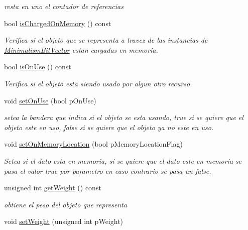 \begin{DoxyCompactItemize}
\begin{DoxyCompactList}\small\item\em resta en uno el contador de referencias \end{DoxyCompactList}\item 
bool \hyperlink{class_minimalism_bit_vector_aa8bba4e5bcfae52caf3c99beb7aae0cf}{is\-Charged\-On\-Memory} () const 
\begin{DoxyCompactList}\small\item\em Verifica si el objeto que se representa a travez de las instancias de \hyperlink{class_minimalism_bit_vector}{Minimalism\-Bit\-Vector} estan cargadas en memoria. \end{DoxyCompactList}\item 
bool \hyperlink{class_minimalism_bit_vector_a7ebf4e232220001d18be6275d9868587}{is\-On\-Use} () const 
\begin{DoxyCompactList}\small\item\em Verifica si el objeto esta siendo usado por algun otro recurso. \end{DoxyCompactList}\item 
void \hyperlink{class_minimalism_bit_vector_a63b95b7f8446bfc105d42837be83b42b}{set\-On\-Use} (bool p\-On\-Use)
\begin{DoxyCompactList}\small\item\em setea la bandera que indica si el objeto se esta usando, true si se quiere que el objeto este en uso, false si se quiere que el objeto ya no este en uso. \end{DoxyCompactList}\item 
void \hyperlink{class_minimalism_bit_vector_a747ed61c44f091dd3326644216a923dd}{set\-On\-Memory\-Location} (bool p\-Memory\-Location\-Flag)
\begin{DoxyCompactList}\small\item\em Setea si el dato esta en memoria, si se quiere que el dato este en memoria se pasa el valor true por parametro en caso contrario se pasa un false. \end{DoxyCompactList}\item 
unsigned int \hyperlink{class_minimalism_bit_vector_af33224c672b353285b59463c2e958061}{get\-Weight} () const 
\begin{DoxyCompactList}\small\item\em obtiene el peso del objeto que representa \end{DoxyCompactList}\item 
void \hyperlink{class_minimalism_bit_vector_ac4480ef294435f54049da5cad957e1a9}{set\-Weight} (unsigned int p\-Weight)

\end{DoxyCompactItemize}
